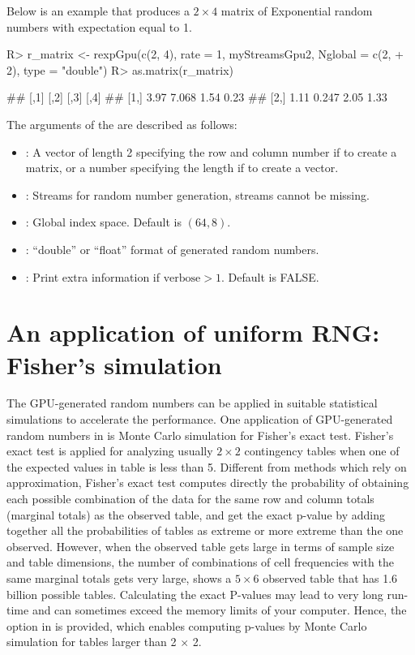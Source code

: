 \documentclass[article,nojss]{jss}\usepackage[]{graphicx}\usepackage[]{color}
\newcommand{\fct}[1]{\code{#1()}}
\begin{document}
Below is an example that produces a $2 \times 4$ matrix of Exponential random numbers with expectation equal to 1.
\begin{CodeChunk}
\begin{CodeInput}
R> r_matrix <- rexpGpu(c(2, 4), rate = 1, myStreamsGpu2, Nglobal = c(2,
+    2), type = "double")
R> as.matrix(r_matrix)
\end{CodeInput}
\begin{CodeOutput}
##      [,1]  [,2] [,3] [,4]
## [1,] 3.97 7.068 1.54 0.23
## [2,] 1.11 0.247 2.05 1.33
\end{CodeOutput} 
\end{CodeChunk} 

The arguments of the \fct{rexpGpu} are described as follows:
\begin{itemize}
\itemsep0em 
  \item {}: A vector of length 2 specifying the row and column number if to create a matrix, or a number specifying the length if to create a vector.
  \item {}: Streams for random number generation, streams cannot be missing.
  \item {}: Global index space. Default is $(64,8)$.
  \item {}: ``double'' or ``float'' format of generated random numbers.
  \item {}: Print extra information if $\text{verbose} > 1$. Default is FALSE.
\end{itemize}





\section{An application of uniform RNG: Fisher's simulation}
The GPU-generated random numbers can be applied in suitable statistical simulations to accelerate the performance.
One application of GPU-generated random numbers in  is Monte Carlo simulation for Fisher's exact test. Fisher’s exact test is applied for analyzing usually $2 \times 2$ contingency tables when one of the expected values in table is less than 5. Different from methods which rely on approximation, Fisher's exact test computes directly the probability of obtaining each possible combination of the data for the same row and column totals (marginal totals) as the observed table, and get the exact p-value by adding together all the probabilities of tables as extreme or more extreme than the one observed. However, when the observed table gets large in terms of sample size and table dimensions, the number of combinations of cell frequencies with the same marginal totals gets very large, \cite[][p. 23]{mehta2011ibm} shows a $5 \times 6$ observed table that has 1.6 billion possible tables. Calculating the exact P-values may lead to very long run-time and can sometimes exceed the memory limits of your computer. Hence, the option  in \fct{stats::fisher.test} is provided, which enables computing p-values by Monte Carlo simulation for tables larger than 2 $\times$ 2. 
\end{document}
